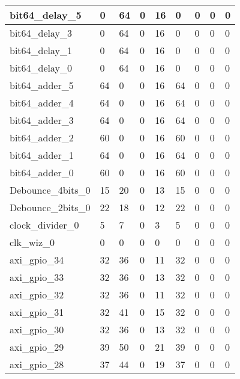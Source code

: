 \begin{landscape}
\begin{longtable}{@{}|l|l|l|l|l|l|l|l|l|@{}}
\rowcolor[HTML]{FFFFFF} 
bit64\_delay\_5 & 0 & 64 & 0 & 16 & 0 & 0 & 0 & 0 \\* \midrule
\rowcolor[HTML]{FFFFFF} 
bit64\_delay\_3 & 0 & 64 & 0 & 16 & 0 & 0 & 0 & 0 \\* \midrule
\rowcolor[HTML]{FFFFFF} 
bit64\_delay\_1 & 0 & 64 & 0 & 16 & 0 & 0 & 0 & 0 \\* \midrule
\rowcolor[HTML]{FFFFFF} 
bit64\_delay\_0 & 0 & 64 & 0 & 16 & 0 & 0 & 0 & 0 \\* \midrule
\rowcolor[HTML]{FFFFFF} 
bit64\_adder\_5 & 64 & 0 & 0 & 16 & 64 & 0 & 0 & 0 \\* \midrule
\rowcolor[HTML]{FFFFFF} 
bit64\_adder\_4 & 64 & 0 & 0 & 16 & 64 & 0 & 0 & 0 \\* \midrule
\rowcolor[HTML]{FFFFFF} 
bit64\_adder\_3 & 64 & 0 & 0 & 16 & 64 & 0 & 0 & 0 \\* \midrule
\rowcolor[HTML]{FFFFFF} 
bit64\_adder\_2 & 60 & 0 & 0 & 16 & 60 & 0 & 0 & 0 \\* \midrule
\rowcolor[HTML]{FFFFFF} 
bit64\_adder\_1 & 64 & 0 & 0 & 16 & 64 & 0 & 0 & 0 \\* \midrule
\rowcolor[HTML]{FFFFFF} 
bit64\_adder\_0 & 60 & 0 & 0 & 16 & 60 & 0 & 0 & 0 \\* \midrule
\rowcolor[HTML]{FFFFFF} 
Debounce\_4bits\_0 & 15 & 20 & 0 & 13 & 15 & 0 & 0 & 0 \\* \midrule
\rowcolor[HTML]{FFFFFF} 
Debounce\_2bits\_0 & 22 & 18 & 0 & 12 & 22 & 0 & 0 & 0 \\* \midrule
\rowcolor[HTML]{FFFFFF} 
clock\_divider\_0 & 5 & 7 & 0 & 3 & 5 & 0 & 0 & 0 \\* \midrule
\rowcolor[HTML]{FFFFFF} 
clk\_wiz\_0 & 0 & 0 & 0 & 0 & 0 & 0 & 0 & 0 \\* \midrule
\rowcolor[HTML]{FFFFFF} 
axi\_gpio\_34 & 32 & 36 & 0 & 11 & 32 & 0 & 0 & 0 \\* \midrule
\rowcolor[HTML]{FFFFFF} 
axi\_gpio\_33 & 32 & 36 & 0 & 13 & 32 & 0 & 0 & 0 \\* \midrule
\rowcolor[HTML]{FFFFFF} 
axi\_gpio\_32 & 32 & 36 & 0 & 11 & 32 & 0 & 0 & 0 \\* \midrule
\rowcolor[HTML]{FFFFFF} 
axi\_gpio\_31 & 32 & 41 & 0 & 15 & 32 & 0 & 0 & 0 \\* \midrule
\rowcolor[HTML]{FFFFFF} 
axi\_gpio\_30 & 32 & 36 & 0 & 13 & 32 & 0 & 0 & 0 \\* \midrule
\rowcolor[HTML]{FFFFFF} 
axi\_gpio\_29 & 39 & 50 & 0 & 21 & 39 & 0 & 0 & 0 \\* \midrule
\rowcolor[HTML]{FFFFFF} 
axi\_gpio\_28 & 37 & 44 & 0 & 19 & 37 & 0 & 0 & 0 \\* \midrule

\end{longtable}
\end{landscape}
